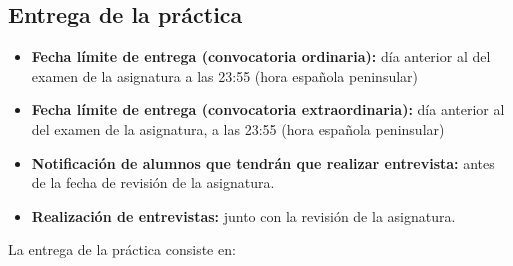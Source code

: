 \subsection{Entrega de la práctica}

\begin{itemize}
  \item \textbf{Fecha límite de entrega (convocatoria ordinaria):} día anterior al del examen de la asignatura a las 23:55 (hora española peninsular)
  \item \textbf{Fecha límite de entrega (convocatoria extraordinaria):} día anterior al del examen de la asignatura, a las 23:55 (hora española peninsular)
  \item \textbf{Notificación de alumnos que tendrán que realizar entrevista:} antes de la fecha de revisión de la asignatura.
  \item \textbf{Realización de entrevistas:} junto con la revisión de la asignatura.    

\end{itemize}

La entrega de la práctica consiste en:

